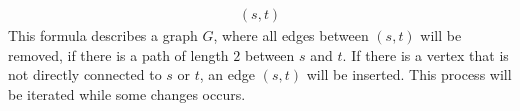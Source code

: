 \begin{example}{\cite{abiteboul1995computing}}
    \begin{align*}
    [PFP\;(&G(x, y) \wedge \neg \exists z\colon\odot.\,(G(x, z) \wedge G(z, y)) \vee \\
    &\exists z\colon\odot.\,(\neg G(x, z)\wedge\neg G(z, x) \wedge \neg G(y, z) \wedge G(z, y)))](s, t)
    \end{align*}
    This formula describes a graph $G$, where all edges between $(s, t)$ will be removed, if there is a path of
    length $2$ between $s$ and $t$. If there is a vertex that is not directly connected to $s$ or $t$, an edge $(s,
    t)$ will be inserted. This process will be iterated while some changes occurs.
\end{example}